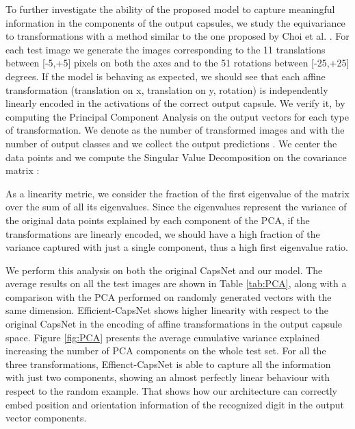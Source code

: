 \documentclass{article}
\begin{document}
To further investigate the ability of the proposed model to capture meaningful information in the components of the output capsules, we study the equivariance to transformations with a method similar to the one proposed by Choi et al. \cite{choi2019attention}. For each test image we generate the images corresponding to the 11 translations between [-5,+5] pixels on both the axes and to the 51 rotations between [-25,+25] degrees. If the model is behaving as expected, we should see that each affine transformation (translation on x, translation on y, rotation) is independently linearly encoded in the activations of the correct output capsule. We verify it, by computing the Principal Component Analysis on the output vectors for each type of transformation.  We denote as  the number of transformed images and with  the number of output classes and we collect the output predictions . We center the data points and we compute the Singular Value Decomposition on the covariance matrix :

\begin{ceqn}

\end{ceqn}

As a linearity metric, we consider the fraction of the first eigenvalue  of the matrix  over the sum of all its eigenvalues. Since the eigenvalues represent the variance of the original data points explained by each component of the PCA, if the transformations are linearly encoded, we should have a high fraction of the variance captured with just a single component, thus a high first eigenvalue ratio.

\begin{ceqn}

\end{ceqn}

We perform this analysis on both the original CapsNet \cite{sabour2017dynamic} and our model. The average results on all the test images are shown in Table \ref{tab:PCA}, along with a comparison with the PCA performed on randomly generated vectors with the same dimension. Efficient-CapsNet shows higher linearity with respect to the original CapsNet in the encoding of affine transformations in the output capsule space. Figure \ref{fig:PCA} presents the average cumulative variance explained increasing the number of PCA components on the whole test set. For all the three transformations, Effienct-CapsNet is able to capture all the information with just two components, showing an almost perfectly linear behaviour with respect to the random example. That shows how our architecture can correctly embed position and orientation information of the recognized digit in the output vector components.  
\end{document}
